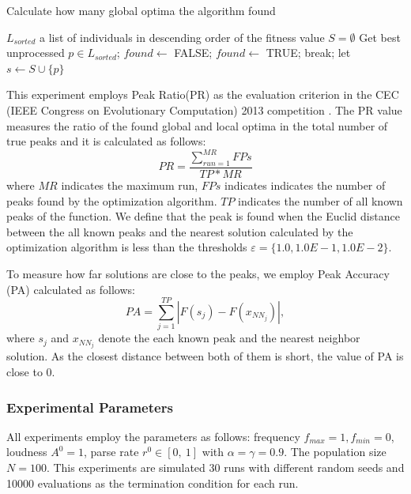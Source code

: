 \documentclass[conference]{IEEEtran}
\begin{document}
\begin{algorithm}[H]
\caption{Calculate how many global optima the algorithm found}
\label{code:foptima}
\begin{algorithmic}[2]
\REQUIRE $L_{sorted}$ a list of individuals in descending order of the fitness value
\STATE $S = \emptyset$
\STATE Get best unprocessed $p \in L_{sorted}$;
\STATE $found \leftarrow$ FALSE;
\STATE $found \leftarrow$ TRUE;
\STATE break;
\ENDIF
\ENDFOR
{}
\STATE let $s \leftarrow S \cup \{p\}$
\ENDIF
\ENDIF
\ENDWHILE
\end{algorithmic}
\end{algorithm}

This experiment employs Peak Ratio(PR) \cite{CDE} as the evaluation criterion in the CEC (IEEE Congress on Evolutionary Computation) 2013 competition \cite{cec2013}. The PR value measures the ratio of the found global and local optima in the total number of true peaks and it is calculated as follows: 
\begin{equation}
\label{eq:PR}
PR=\frac{\sum_{run=1}^{MR}FPs}{TP*MR}
\end{equation}
 where ${MR}$ indicates the maximum run, ${FPs}$ indicates indicates the number of peaks found by the optimization algorithm. ${TP}$ indicates the number of all known peaks of the function. We define that the peak is found when the Euclid distance between the all known peaks and the nearest solution calculated by the optimization algorithm is less than the thresholds $\varepsilon = \{1.0, 1.0E-1, 1.0E-2\}$.

To measure how far solutions are close to the peaks, we employ Peak Accuracy (PA) \cite{CDE} calculated as follows:
\begin{equation}
PA=\sum_{j=1}^{TP}|F(s_j)-F(x_{NN_j})|,
\end{equation}
where $s_j$ and $x_{NN_j}$ denote the each known peak and the nearest neighbor solution. As the closest distance between both of them is short, the value of PA is close to 0.  

 \subsubsection{Experimental Parameters}
All experiments employ the parameters as follows: frequency ${f_{max}=1, f_{min}=0}$, loudness ${A^0}=1$, parse rate ${r^0} \in [0, \ 1]$ with ${\alpha =\gamma = 0.9}$. The population size ${N=100}$. This experiments are simulated 30 runs with different random seeds and 10000 evaluations as the termination condition for each run.
\end{document}
